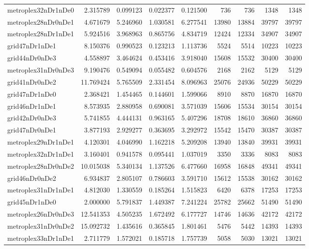 \begin{longtable}{|l|r|r|r|r|r|r|r|r|}
metroplex32nDr1nDe0 & 2.315789 & 0.099123 & 0.022377 & 0.121500 & 736 & 736 & 1348 & 1348 \\
metroplex28nDr0nDe1 & 4.671679 & 5.246960 & 1.030581 & 6.277541 & 13980 & 13884 & 39797 & 39797 \\
metroplex28nDr1nDe1 & 5.924516 & 3.968963 & 0.865756 & 4.834719 & 12424 & 12334 & 34907 & 34907 \\
grid47nDr1nDe1 & 8.150376 & 0.990523 & 0.123213 & 1.113736 & 5524 & 5514 & 10223 & 10223 \\
grid44nDr0nDe3 & 4.558897 & 3.464624 & 0.453416 & 3.918040 & 15608 & 15532 & 30400 & 30400 \\
metroplex31nDr0nDe3 & 9.190476 & 0.549094 & 0.055482 & 0.604576 & 2168 & 2162 & 5129 & 5129 \\
grid41nDr0nDe2 & 11.769424 & 5.765509 & 2.331454 & 8.096963 & 25076 & 24936 & 50229 & 50229 \\
grid47nDr1nDe0 & 2.368421 & 1.454465 & 0.144601 & 1.599066 & 8910 & 8870 & 16870 & 16870 \\
grid46nDr1nDe1 & 8.573935 & 2.880958 & 0.690081 & 3.571039 & 15606 & 15534 & 30154 & 30154 \\
grid42nDr0nDe3 & 5.741855 & 4.444131 & 0.963165 & 5.407296 & 18708 & 18610 & 36860 & 36860 \\
grid47nDr0nDe1 & 3.877193 & 2.929277 & 0.363695 & 3.292972 & 15542 & 15470 & 30387 & 30387 \\
metroplex29nDr1nDe1 & 4.120301 & 4.046990 & 1.162218 & 5.209208 & 13940 & 13840 & 39931 & 39931 \\
metroplex32nDr1nDe1 & 3.160401 & 0.941578 & 0.095441 & 1.037019 & 3350 & 3336 & 8083 & 8083 \\
metroplex28nDr0nDe2 & 10.015038 & 5.340134 & 1.137526 & 6.477660 & 16958 & 16848 & 49341 & 49341 \\
grid46nDr0nDe2 & 6.934837 & 2.805107 & 0.786603 & 3.591710 & 15612 & 15538 & 30162 & 30162 \\
metroplex31nDr1nDe1 & 4.812030 & 1.330559 & 0.185264 & 1.515823 & 6420 & 6378 & 17253 & 17253 \\
grid45nDr1nDe0 & 2.000000 & 5.791837 & 1.449387 & 7.241224 & 25782 & 25662 & 51490 & 51490 \\
metroplex26nDr0nDe3 & 12.541353 & 4.505235 & 1.672492 & 6.177727 & 14746 & 14636 & 42172 & 42172 \\
metroplex31nDr0nDe2 & 15.092732 & 1.435616 & 0.365845 & 1.801461 & 5476 & 5442 & 14393 & 14393 \\
metroplex33nDr1nDe1 & 2.711779 & 1.572021 & 0.185718 & 1.757739 & 5058 & 5030 & 13021 & 13021 \\

\end{longtable}
